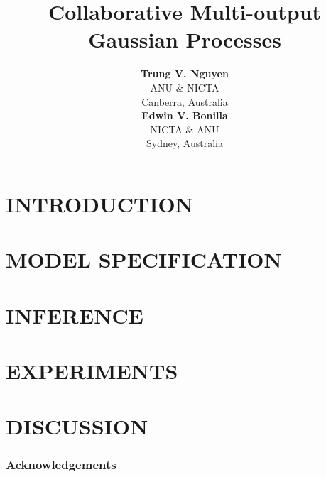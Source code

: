 \documentclass[]{article}
\title{Collaborative Multi-output Gaussian Processes}
\author{} %
\author{ {\bf Trung V. Nguyen} \\
ANU \& NICTA \\
Canberra, Australia\\
\And
{\bf Edwin V. Bonilla}  \\
NICTA \& ANU          \\
Sydney, Australia \\
}
\begin{document}
\maketitle

\begin{abstract}

\end{abstract}

\section{INTRODUCTION}


\section{MODEL SPECIFICATION \label{sec:model}}


\section{INFERENCE \label{sec:inference}}


\section{EXPERIMENTS \label{sec:experiments}}


\section{DISCUSSION \label{sec:discussion}}


\subsubsection*{Acknowledgements}



\end{document}
